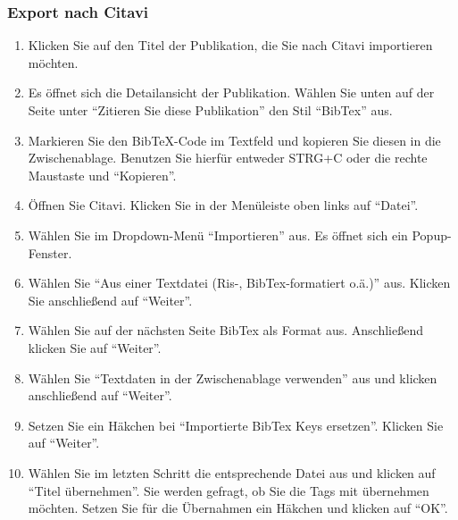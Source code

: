 \subsubsection*{Export nach Citavi}\label{sss:exportCitavi}
\begin{enumerate}
	\item Klicken Sie auf den Titel der Publikation, die Sie nach Citavi importieren möchten.
	\item Es öffnet sich die Detailansicht der Publikation. Wählen Sie unten auf der Seite unter \enquote{Zitieren Sie diese Publikation} den Stil \enquote{BibTex} aus. 
	\item Markieren Sie den BibTeX-Code im Textfeld und kopieren Sie diesen in die Zwischenablage. Benutzen Sie hierfür entweder STRG+C oder die rechte Maustaste und \enquote{Kopieren}.
	\item Öffnen Sie Citavi. Klicken Sie in der Menüleiste oben links auf \enquote{Datei}.
	\item Wählen Sie im Dropdown-Menü \enquote{Importieren} aus. Es öffnet sich ein Popup-Fenster.
	\item Wählen Sie \enquote{Aus einer Textdatei (Ris-, BibTex-formatiert o.ä.)} aus. Klicken Sie anschließend auf \enquote{Weiter}.
	\item Wählen Sie auf der nächsten Seite BibTex als Format aus. Anschließend klicken Sie auf \enquote{Weiter}.
	\item Wählen Sie \enquote{Textdaten in der Zwischenablage verwenden} aus und klicken anschließend auf \enquote{Weiter}.
	\item Setzen Sie ein Häkchen bei \enquote{Importierte BibTex Keys ersetzen}. Klicken Sie auf \enquote{Weiter}.
	\item Wählen Sie im letzten Schritt die entsprechende Datei aus und klicken auf \enquote{Titel übernehmen}. Sie werden gefragt, ob Sie die Tags mit übernehmen möchten. Setzen Sie für die Übernahmen ein Häkchen und klicken auf \enquote{OK}.
\end{enumerate}




